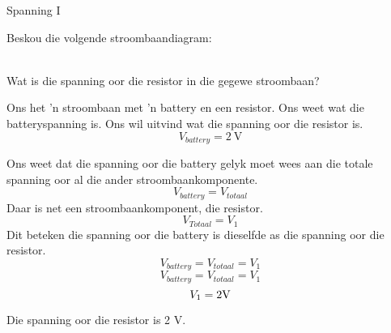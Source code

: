\begin{wex}{Spanning I}{
Beskou die volgende stroombaandiagram:\\
\begin{center}
\end{center}\\
Wat is die spanning oor die resistor in die gegewe stroombaan?
}{%
Ons het 'n stroombaan met 'n battery en een resistor. Ons weet wat die
batteryspanning is. Ons wil uitvind wat die spanning oor die resistor is.
\begin{equation*}
V_{battery} = 2~\text{V}
\end{equation*}

Ons weet dat die spanning oor die battery gelyk moet wees aan die totale
spanning oor al die ander stroombaankomponente.
\begin{equation*}
V_{battery} = V_{totaal}
\end{equation*}
Daar is net een stroombaankomponent, die resistor.
\begin{equation*}
V_{Totaal} = V_{1}
\end{equation*}
Dit beteken die spanning oor die battery is dieselfde as die spanning oor
die resistor.
\begin{equation*}
V_{battery} = V_{totaal} = V_{1}
\end{equation*}
\begin{equation*}
V_{battery} = V_{totaal} = V_{1}
\end{equation*}
\begin{equation*}
V_{1} = 2\rm{V}
\end{equation*}

Die spanning oor die resistor is 2 V.


}\end{wex}

